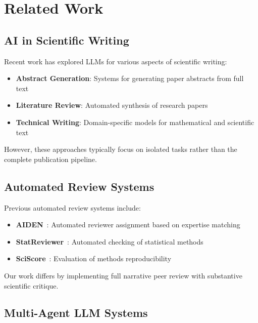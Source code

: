 \documentclass[11pt,a4paper]{article}
\begin{document}
\section{Related Work}

\subsection{AI in Scientific Writing}

Recent work has explored LLMs for various aspects of scientific writing:

\begin{itemize}
    \item \textbf{Abstract Generation}: Systems for generating paper abstracts from full text~\cite{cohan2018discourse}
    \item \textbf{Literature Review}: Automated synthesis of research papers~\cite{taylor2022galactica}
    \item \textbf{Technical Writing}: Domain-specific models for mathematical and scientific text~\cite{lewkowycz2022solving}
\end{itemize}

However, these approaches typically focus on isolated tasks rather than the complete publication pipeline.

\subsection{Automated Review Systems}

Previous automated review systems include:

\begin{itemize}
    \item \textbf{AIDEN}~\cite{price2017computational}: Automated reviewer assignment based on expertise matching
    \item \textbf{StatReviewer}~\cite{hardwicke2020calibrating}: Automated checking of statistical methods
    \item \textbf{SciScore}~\cite{menke2020rigor}: Evaluation of methods reproducibility
\end{itemize}

Our work differs by implementing full narrative peer review with substantive scientific critique.

\subsection{Multi-Agent LLM Systems}
\end{document}
